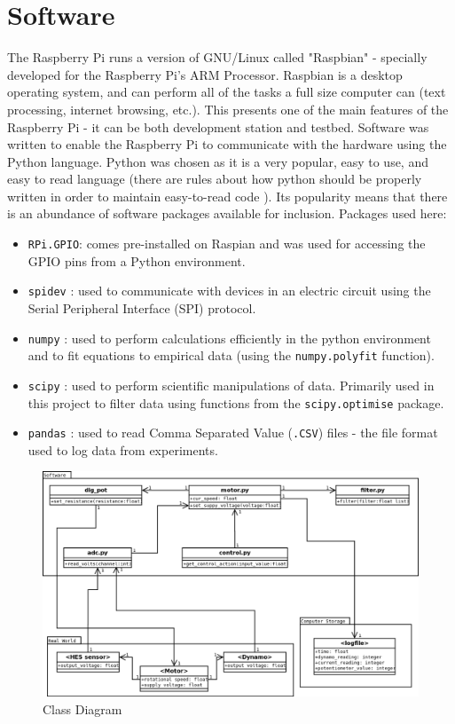 \documentclass[twoside,a4]{report}
\def\br{\newline \newline \noindent}
\begin{document}
	\section{Software}
	The Raspberry Pi runs a version of GNU/Linux called "Raspbian" - specially developed for the Raspberry Pi's ARM Processor. Raspbian is a desktop operating system, and can perform all of the tasks a full size computer can (text processing, internet browsing, etc.). This presents one of the main features of the Raspberry Pi - it can be both development station and testbed. Software was written to enable the Raspberry Pi to communicate with the hardware using the Python language. Python was chosen as it is a very popular, easy to use, and easy to read language (there are rules about how python should be properly written in order to maintain easy-to-read code \cite{pep8ref}). Its popularity means that there is an abundance of software packages available for inclusion. 
	\br
	Packages used here:
	\begin{itemize}
		\item \texttt{RPi.GPIO}\cite{citerpigpio}: comes pre-installed on Raspian and was used for accessing the GPIO pins from a Python environment.
		\item \texttt{spidev} \cite{srcspidev}: used to communicate with devices in an electric circuit using the Serial Peripheral Interface (SPI) protocol.
		\item \texttt{numpy} \cite{numpyref}: used to perform calculations efficiently in the python environment and to fit equations to empirical data (using the \texttt{numpy.polyfit} function).
		\item \texttt{scipy} \cite{scipyref}: used to perform scientific manipulations of data. Primarily used in this project to filter data using functions from the \texttt{scipy.optimise} package.
		\item \texttt{pandas} \cite{pandasref}: used to read Comma Separated Value (\texttt{.CSV}) files - the file format used to log data from experiments.
	\end{itemize}
	
	\begin{figure}[!htb]
		\centering
		\includegraphics[scale=0.35]{images/codemap.png}
		\caption{Class Diagram}
		\label{figcladia}
	\end{figure}
	
\end{document}
